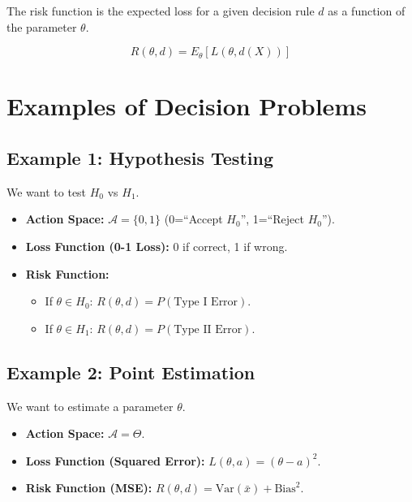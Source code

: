 \documentclass[
  letterpaper,
  DIV=11,
  numbers=noendperiod]{scrreprt}
\providecommand{\tightlist}{%
  \setlength{\itemsep}{0pt}\setlength{\parskip}{0pt}}
\renewcommand{\[}{\begin{equation}}
\renewcommand{\]}{\end{equation}}
\theoremstyle{definition}
\theoremstyle{plain}
\theoremstyle{plain}
\theoremstyle{plain}
\theoremstyle{definition}
\theoremstyle{plain}
\theoremstyle{remark}
\begin{document}
The risk function is the expected loss for a given decision rule \(d\)
as a function of the parameter \(\theta\).

\[R(\theta, d) = E_\theta[L(\theta, d(X))]\]

\section{Examples of Decision
Problems}\label{examples-of-decision-problems}

\subsection{Example 1: Hypothesis
Testing}\label{example-1-hypothesis-testing}

We want to test \(H_0\) vs \(H_1\).

\begin{itemize}
\tightlist
\item
  \textbf{Action Space:} \(\mathcal{A} = \{0, 1\}\) (0=``Accept
  \(H_0\)'', 1=``Reject \(H_0\)'').
\item
  \textbf{Loss Function (0-1 Loss):} 0 if correct, 1 if wrong.
\item
  \textbf{Risk Function:}

  \begin{itemize}
  \tightlist
  \item
    If \(\theta \in H_0\): \(R(\theta, d) = P(\text{Type I Error})\).
  \item
    If \(\theta \in H_1\): \(R(\theta, d) = P(\text{Type II Error})\).
  \end{itemize}
\end{itemize}

\subsection{Example 2: Point
Estimation}\label{example-2-point-estimation}

We want to estimate a parameter \(\theta\).

\begin{itemize}
\tightlist
\item
  \textbf{Action Space:} \(\mathcal{A} = \Theta\).
\item
  \textbf{Loss Function (Squared Error):}
  \(L(\theta, a) = (\theta - a)^2\).
\item
  \textbf{Risk Function (MSE):}
  \(R(\theta, d) = \text{Var}(\bar{x}) + \text{Bias}^2\).
\end{itemize}
\end{document}
